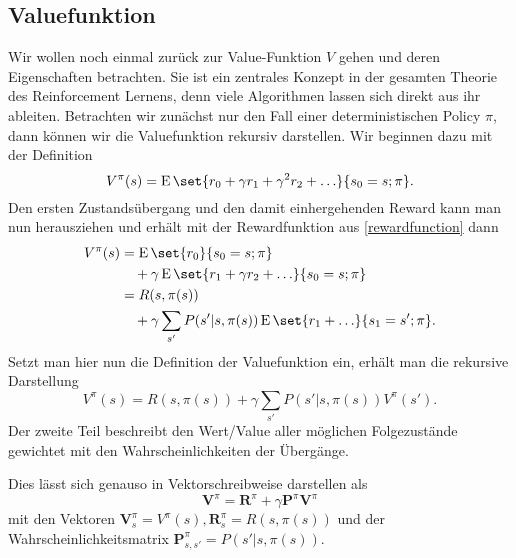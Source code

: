 \documentclass[ngerman]{../LaTeX-Templates/Paper/paper}
\newcommand{\E}{\ensuremath{\operatorname{E}}}
\begin{document}
\subsection{Valuefunktion}
Wir wollen noch einmal zurück zur Value-Funktion $V$ gehen und deren Eigenschaften betrachten. Sie ist ein zentrales Konzept in der gesamten Theorie des Reinforcement Lernens, denn viele Algorithmen lassen sich direkt aus ihr ableiten. Betrachten wir zunächst nur den Fall einer deterministischen Policy $\pi$, dann können wir die Valuefunktion rekursiv darstellen. Wir beginnen dazu mit der Definition
\begin{equation*}
	V^\pi(s)=\E\set{r_0+\gamma r_1+\gamma^2r_2+\ldots}{s_0=s;\pi}.
\end{equation*}
Den ersten Zustandsübergang und den damit einhergehenden Reward kann man nun herausziehen und erhält mit der Rewardfunktion aus \autoref{rewardfunction} dann
\begin{align*}
	V^\pi(s)&=\E\set{r_0}{s_0=s;\pi}\\
	&\quad+\gamma\E\set{r_1+\gamma r_2+\ldots}{s_0=s;\pi}\\
	&=R(s,\pi(s))\\
	&\quad+\gamma\sum_{s'}P(s'|s,\pi(s))\E\set{r_1+\ldots}{s_1=s';\pi}.
\end{align*}
Setzt man hier nun die Definition der Valuefunktion ein, erhält man die rekursive Darstellung
\begin{equation*}
	V^\pi(s)=R(s,\pi(s))+\gamma\sum_{s'}P(s'|s,\pi(s))V^\pi(s').
\end{equation*}
Der zweite Teil beschreibt den Wert/Value aller möglichen Folgezustände gewichtet mit den Wahrscheinlichkeiten der Übergänge.


Dies lässt sich genauso in Vektorschreibweise darstellen als
\begin{equation*}
	\mathbf V^\pi = \mathbf R^\pi+\gamma \mathbf P^\pi \mathbf V^\pi
\end{equation*}
mit den Vektoren $\mathbf V_s^\pi=V^\pi(s), \mathbf R_s^\pi=R(s,\pi(s))$ und der Wahrscheinlichkeitsmatrix $\mathbf P_{s,s'}^\pi=P(s'|s,\pi(s))$.

\end{document}
